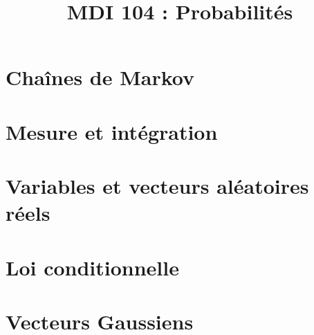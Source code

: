 \documentclass[a4paper,9pt]{article}
\title{\vspace{-1.2cm} \textbf{MDI 104 : Probabilités}}
\begin{document}
	\maketitle
	\vspace{-1.5cm}






\section{Chaînes de Markov}

	


\section{Mesure et intégration}

	


\section{Variables et vecteurs aléatoires réels}

	


\section{Loi conditionnelle}

	





\section{Vecteurs Gaussiens}

	
\end{document}
